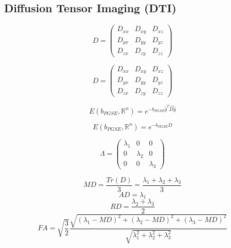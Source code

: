  \subsection{Diffusion Tensor Imaging (DTI)}

 \begin{equation}
    D = 
    \begin{pmatrix}
        D_{xx} & D_{xy} & D_{xz} \\
        D_{yx} & D_{yy} & D_{yz} \\
        D_{zx} & D_{zy} & D_{zz}
    \end{pmatrix}
 \end{equation}

 \begin{equation}
    D = 
    \begin{pmatrix}
        D_{xx} & D_{xy} & D_{xz} \\
        D_{yx} & D_{yy} & D_{yz} \\
        D_{zx} & D_{zy} & D_{zz}
    \end{pmatrix}
 \end{equation}

 \begin{equation}
    E(b_{PGSE}, \mathbb{R}^n) = e^{-b_{PGSE}\hat{g}^{T}\vec{D}\hat{g}}
 \end{equation}

 \begin{equation}
    E(b_{PGSE}, \mathbb{R}^n) = e^{-b_{PGSE}D}
 \end{equation}

 \begin{equation}
    \Lambda = 
    \begin{pmatrix}
        \lambda_{1} & 0 & 0 \\
        0 & \lambda_{2} & 0 \\
        0 & 0 & \lambda_{3}
    \end{pmatrix}
 \end{equation}

 \begin{equation}
    {MD} = \frac{{Tr}(D)}{3} = \frac{\lambda_1 + \lambda_2 + \lambda_3}{3}
 \end{equation}
 \begin{equation}
    AD = \lambda_1
 \end{equation}
 \begin{equation}
    RD = \frac{\lambda_2+\lambda_3}{2}
 \end{equation}
 \begin{equation}
    FA = \sqrt{\frac{3}{2}}\frac{\sqrt{(\lambda_1-MD)^2+(\lambda_2-MD)^2+(\lambda_3-MD)^2}}{\sqrt{\lambda_1^2+\lambda_2^2+\lambda_3^2}}
 \end{equation}

